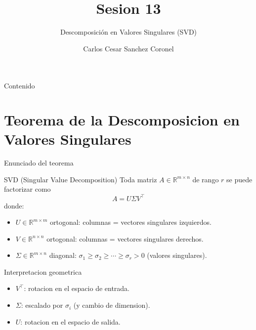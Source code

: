 \documentclass[aspectratio=169, 10pt, xcolor=table]{beamer}
\title[SESION 13 CALCULO]{\textbf{Sesion 13}}
\subtitle{Descomposición en Valores Singulares (SVD)}
\author[Prof. C. Sanchez]{Carlos Cesar Sanchez Coronel}
\institute{\textbf{CALCULO Y ALGEBRA LINEAL PARA IA}}
\date{}
\begin{document}
\begin{frame}
    \titlepage
\end{frame}

\begin{frame}{Contenido}
    \tableofcontents
\end{frame}

\section{Teorema de la Descomposicion en Valores Singulares}

\begin{frame}{Enunciado del teorema}
    \begin{block}{SVD (Singular Value Decomposition)}
        Toda matriz $A\in\mathbb{R}^{m\times n}$ de rango $r$ se puede factorizar como
        \[
        A = U\Sigma V^\top
        \]
        donde:
        \begin{itemize}
            \item $U\in\mathbb{R}^{m\times m}$ ortogonal: columnas = vectores singulares izquierdos.
            \item $V\in\mathbb{R}^{n\times n}$ ortogonal: columnas = vectores singulares derechos.
            \item $\Sigma\in\mathbb{R}^{m\times n}$ diagonal: $\sigma_1\ge\sigma_2\ge\cdots\ge\sigma_r>0$ (valores singulares).
        \end{itemize}
    \end{block}
\end{frame}

\begin{frame}{Interpretacion geometrica}
    \centering
    \begin{itemize}
        \item $V^\top$: rotacion en el espacio de entrada.
        \item $\Sigma$: escalado por $\sigma_i$ (y cambio de dimension).
        \item $U$: rotacion en el espacio de salida.
    \end{itemize}
\end{frame}
\end{document}
